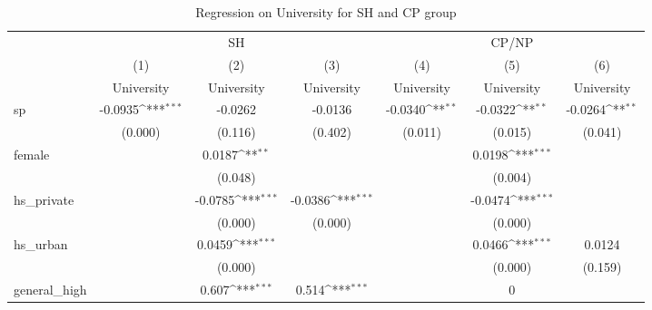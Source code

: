 \documentclass[]{AEA}
\def\sym#1{\ifmmode^{#1}\else\(^{#1}\)\fi}
\begin{document}
    \begin{center}
    \begin{table}
    \caption{Regression on University for SH and CP group}
    \setlength{\tabcolsep}{0.5mm}
    \begin{tabular}{l*{6}c}
    \toprule
    &\multicolumn{3}{c}{SH} &\multicolumn{3}{c}{CP/NP} \\
    \cmidrule(l){2-4}\cmidrule(l){5-7}
    &\multicolumn{1}{c}{(1)}&\multicolumn{1}{c}{(2)}&\multicolumn{1}{c}{(3)}&\multicolumn{1}{c}{(4)}&\multicolumn{1}{c}{(5)}&\multicolumn{1}{c}{(6)} \\
    &\multicolumn{1}{c}{University}&\multicolumn{1}{c}{University}&\multicolumn{1}{c}{University}&\multicolumn{1}{c}{University}&\multicolumn{1}{c}{University}&\multicolumn{1}{c}{University} \\
    \midrule
    sp          &     -0.0935\sym{***}&     -0.0262         &     -0.0136         &     -0.0340\sym{**} &     -0.0322\sym{**} &     -0.0264\sym{**} \\
                &     (0.000)         &     (0.116)         &     (0.402)         &     (0.011)         &     (0.015)         &     (0.041)         \\
    [1em]
    female      &                     &      0.0187\sym{**} &                     &                     &      0.0198\sym{***}&                     \\
                &                     &     (0.048)         &                     &                     &     (0.004)         &                     \\
    [1em]
    hs\_private  &                     &     -0.0785\sym{***}&     -0.0386\sym{***}&                     &     -0.0474\sym{***}&                     \\
                &                     &     (0.000)         &     (0.000)         &                     &     (0.000)         &                     \\
    [1em]
    hs\_urban    &                     &      0.0459\sym{***}&                     &                     &      0.0466\sym{***}&      0.0124         \\
                &                     &     (0.000)         &                     &                     &     (0.000)         &     (0.159)         \\
    [1em]
    general\_high&                     &       0.607\sym{***}&       0.514\sym{***}&                     &           0         &                     \\

\end{tabular}
\end{table}
\end{center}
\end{document}
